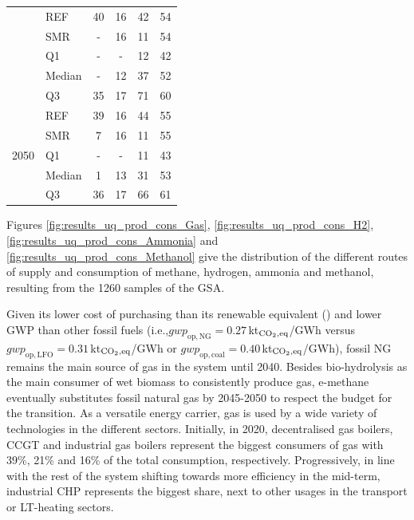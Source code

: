 \documentclass[11pt,twoside,a4paper,english]{article}
\def\ie{i.e.,}
\begin{document}
\begin{appendices}
\begin{table}[htbp!]
\begin{minipage}{\textwidth}
{\begin{tabular}{l l | c c c c}
 & REF & 40 & 16 & 42 & 54\\
 & SMR & - & 16 & 11 & 54\\
 \cmidrule{2 - 6}
 & Q1 & - & - & 12 & 42\\
 & Median & - & 12 & 37 & 52\\
 & Q3 & 35 & 17 & 71 & 60\\
\toprule
\multirow{5}{*}{2050}
 & REF & 39 & 16 & 44 & 55\\
 & SMR & 7 & 16 & 11 & 55\\
 \cmidrule{2 - 6}
 & Q1 & - & - & 11 & 43\\
 & Median & 1 & 13 & 31 & 53\\
 & Q3 & 36 & 17 & 66 & 61\\
\bottomrule							
\end{tabular}}
\end{minipage}
\end{table}

Figures \ref{fig:results_uq_prod_cons_Gas}, \ref{fig:results_uq_prod_cons_H2}, \ref{fig:results_uq_prod_cons_Ammonia} and \ref{fig:results_uq_prod_cons_Methanol} give the distribution of the different routes of supply and consumption of methane, hydrogen, ammonia and methanol, resulting from the 1260 samples of the \gls{GSA}.

Given its lower cost of purchasing than its renewable equivalent () and lower \gls{GWP} than other fossil fuels (\ie $\mathit{gwp}_{\mathrm{op,NG}}=0.27$\,kt$_{\ce{CO2},\text{eq}}$/GWh versus $\mathit{gwp}_{\mathrm{op,LFO}}=0.31$\,kt$_{\ce{CO2},\text{eq}}$/GWh or $\mathit{gwp}_{\mathrm{op,coal}}=0.40$\,kt$_{\ce{CO2},\text{eq}}$/GWh), fossil \gls{NG} remains the main source of gas in the system until 2040. Besides bio-hydrolysis as the main consumer of wet biomass to consistently produce gas, e-methane eventually substitutes fossil natural gas by 2045-2050 to respect the  budget for the transition. As a versatile energy carrier, gas is used by a wide variety of technologies in the different sectors. Initially, in 2020, decentralised gas boilers, \gls{CCGT} and industrial gas boilers represent the biggest consumers of gas with 39\%, 21\% and 16\% of the total consumption, respectively. Progressively, in line with the rest of the system shifting towards more efficiency in the mid-term, industrial \gls{CHP} represents the biggest share, next to other usages in the transport or \gls{LT}-heating sectors.


\end{appendices}
\end{document}
